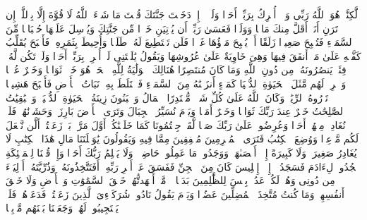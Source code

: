 \stopbuffer%
\startbuffer[\q:18:38]
لَّٰكِنَّا۠ هُوَ ٱللَّهُ رَبِّی وَلَاۤ أُشۡرِكُ بِرَبِّیۤ أَحَدࣰا%
\stopbuffer%
\startbuffer[\q:18:39]
وَلَوۡلَاۤ إِذۡ دَخَلۡتَ جَنَّتَكَ قُلۡتَ مَا شَاۤءَ ٱللَّهُ لَا قُوَّةَ إِلَّا بِٱللَّهِۚ إِن تَرَنِ أَنَا۠ أَقَلَّ مِنكَ مَالࣰا وَوَلَدࣰا%
\stopbuffer%
\startbuffer[\q:18:40]
فَعَسَىٰ رَبِّیۤ أَن یُؤۡتِیَنِ خَیۡرࣰا مِّن جَنَّتِكَ وَیُرۡسِلَ عَلَیۡهَا حُسۡبَانࣰا مِّنَ ٱلسَّمَاۤءِ فَتُصۡبِحَ صَعِیدࣰا زَلَقًا%
\stopbuffer%
\startbuffer[\q:18:41]
أَوۡ یُصۡبِحَ مَاۤؤُهَا غَوۡرࣰا فَلَن تَسۡتَطِیعَ لَهُۥ طَلَبࣰا%
\stopbuffer%
\startbuffer[\q:18:42]
وَأُحِیطَ بِثَمَرِهِۦ فَأَصۡبَحَ یُقَلِّبُ كَفَّیۡهِ عَلَىٰ مَاۤ أَنفَقَ فِیهَا وَهِیَ خَاوِیَةٌ عَلَىٰ عُرُوشِهَا وَیَقُولُ یَٰلَیۡتَنِی لَمۡ أُشۡرِكۡ بِرَبِّیۤ أَحَدࣰا%
\stopbuffer%
\startbuffer[\q:18:43]
وَلَمۡ تَكُن لَّهُۥ فِئَةࣱ یَنصُرُونَهُۥ مِن دُونِ ٱللَّهِ وَمَا كَانَ مُنتَصِرًا%
\stopbuffer%
\startbuffer[\q:18:44]
هُنَالِكَ ٱلۡوَلَٰیَةُ لِلَّهِ ٱلۡحَقِّۚ هُوَ خَیۡرࣱ ثَوَابࣰا وَخَیۡرٌ عُقۡبࣰا%
\stopbuffer%
\startbuffer[\q:18:45]
وَٱضۡرِبۡ لَهُم مَّثَلَ ٱلۡحَیَوٰةِ ٱلدُّنۡیَا كَمَاۤءٍ أَنزَلۡنَٰهُ مِنَ ٱلسَّمَاۤءِ فَٱخۡتَلَطَ بِهِۦ نَبَاتُ ٱلۡأَرۡضِ فَأَصۡبَحَ هَشِیمࣰا تَذۡرُوهُ ٱلرِّیَٰحُۗ وَكَانَ ٱللَّهُ عَلَىٰ كُلِّ شَیۡءࣲ مُّقۡتَدِرًا%
\stopbuffer%
\startbuffer[\q:18:46]
ٱلۡمَالُ وَٱلۡبَنُونَ زِینَةُ ٱلۡحَیَوٰةِ ٱلدُّنۡیَاۖ وَٱلۡبَٰقِیَٰتُ ٱلصَّٰلِحَٰتُ خَیۡرٌ عِندَ رَبِّكَ ثَوَابࣰا وَخَیۡرٌ أَمَلࣰا%
\stopbuffer%
\startbuffer[\q:18:47]
وَیَوۡمَ نُسَیِّرُ ٱلۡجِبَالَ وَتَرَى ٱلۡأَرۡضَ بَارِزَةࣰ وَحَشَرۡنَٰهُمۡ فَلَمۡ نُغَادِرۡ مِنۡهُمۡ أَحَدࣰا%
\stopbuffer%
\startbuffer[\q:18:48]
وَعُرِضُوا۟ عَلَىٰ رَبِّكَ صَفࣰّا لَّقَدۡ جِئۡتُمُونَا كَمَا خَلَقۡنَٰكُمۡ أَوَّلَ مَرَّةِۭۚ بَلۡ زَعَمۡتُمۡ أَلَّن نَّجۡعَلَ لَكُم مَّوۡعِدࣰا%
\stopbuffer%
\startbuffer[\q:18:49]
وَوُضِعَ ٱلۡكِتَٰبُ فَتَرَى ٱلۡمُجۡرِمِینَ مُشۡفِقِینَ مِمَّا فِیهِ وَیَقُولُونَ یَٰوَیۡلَتَنَا مَالِ هَٰذَا ٱلۡكِتَٰبِ لَا یُغَادِرُ صَغِیرَةࣰ وَلَا كَبِیرَةً إِلَّاۤ أَحۡصَىٰهَاۚ وَوَجَدُوا۟ مَا عَمِلُوا۟ حَاضِرࣰاۗ وَلَا یَظۡلِمُ رَبُّكَ أَحَدࣰا%
\stopbuffer%
\startbuffer[\q:18:50]
وَإِذۡ قُلۡنَا لِلۡمَلَٰۤئِكَةِ ٱسۡجُدُوا۟ لِءَادَمَ فَسَجَدُوۤا۟ إِلَّاۤ إِبۡلِیسَ كَانَ مِنَ ٱلۡجِنِّ فَفَسَقَ عَنۡ أَمۡرِ رَبِّهِۦۤۗ أَفَتَتَّخِذُونَهُۥ وَذُرِّیَّتَهُۥۤ أَوۡلِیَاۤءَ مِن دُونِی وَهُمۡ لَكُمۡ عَدُوُّۢۚ بِئۡسَ لِلظَّٰلِمِینَ بَدَلࣰا%
\stopbuffer%
\startbuffer[\q:18:51]
۞ مَّاۤ أَشۡهَدتُّهُمۡ خَلۡقَ ٱلسَّمَٰوَٰتِ وَٱلۡأَرۡضِ وَلَا خَلۡقَ أَنفُسِهِمۡ وَمَا كُنتُ مُتَّخِذَ ٱلۡمُضِلِّینَ عَضُدࣰا%
\stopbuffer%
\startbuffer[\q:18:52]
وَیَوۡمَ یَقُولُ نَادُوا۟ شُرَكَاۤءِیَ ٱلَّذِینَ زَعَمۡتُمۡ فَدَعَوۡهُمۡ فَلَمۡ یَسۡتَجِیبُوا۟ لَهُمۡ وَجَعَلۡنَا بَیۡنَهُم مَّوۡبِقࣰا%
